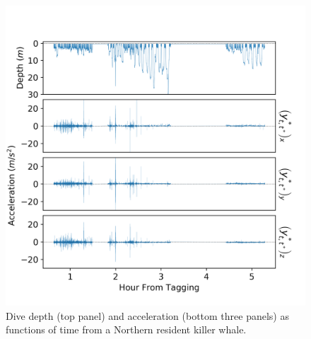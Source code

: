 
\begin{figure}[ht]
	\centering
	\includegraphics[width=5.25in]{../Plots/raw_data.png}
	\caption{Dive depth (top panel) and acceleration (bottom three panels) as functions of time from a Northern resident killer whale.}
	\label{fig:data}
\end{figure}

